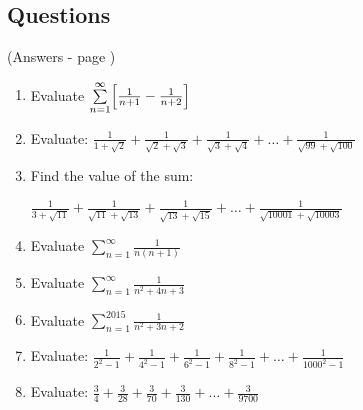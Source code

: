 \documentclass[../main.tex]{subfiles}
\begin{document}
\subsection*{Questions}
(Answers - page \pageref*{Telescoping sums answers})
\label{telescoping sums}
\begin{enumerate}[itemsep=1cm]
    \item 
    Evaluate $\sum\limits_{n=1}^\infty \Bigl[\frac{1}{n+1}-\frac{1}{n+2}\Bigr]$

    \item 
    Evaluate: $\frac{1}{1+\sqrt{2}}+\frac{1}{\sqrt{2}+\sqrt{3}}+\frac{1}{\sqrt{3}+\sqrt{4}}+\dots +\frac{1}{\sqrt{99}+\sqrt{100}}$

    \item 
    Find the value of the sum:

    $\frac{1}{3+\sqrt{11}}+\frac{1}{\sqrt{11}+\sqrt{13}}+\frac{1}{\sqrt{13}+\sqrt{15}}+\dots +\frac{1}{\sqrt{10001}+\sqrt{10003}}$

    \item 
    Evaluate $\sum\limits_{n=1}^\infty \frac{1}{n(n+1)}$

    \item 
    Evaluate $\sum\limits_{n=1}^\infty \frac{1}{n^2 +4n+3}$

    \item 
    Evaluate $\sum\limits_{n=1}^{2015} \frac{1}{n^2 +3n+2}$

    \item 
    Evaluate: $\frac{1}{2^2-1}+\frac{1}{4^2-1}+\frac{1}{6^2-1}+\frac{1}{8^2-1}+\dots +\frac{1}{1000^2-1}$

    \item 
    Evaluate: $\frac{3}{4}+\frac{3}{28}+\frac{3}{70}+\frac{3}{130}+\dots +\frac{3}{9700}$

\end{enumerate}
\end{document}
